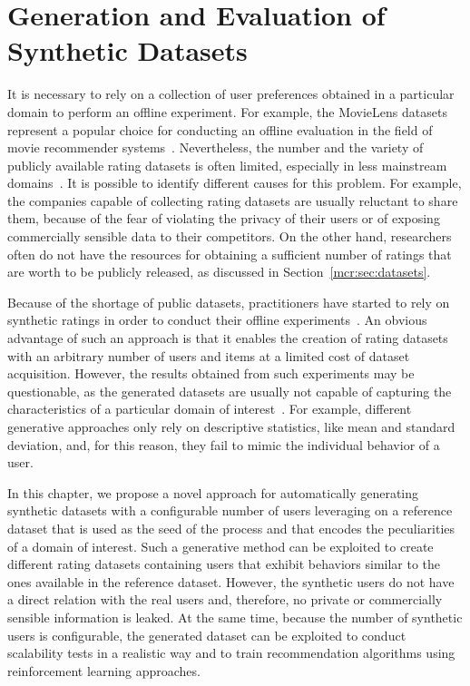 \chapter{Generation and Evaluation of Synthetic Datasets}
\label{chap:synthetic}

It is necessary to rely on a collection of user preferences obtained in a particular domain to perform an offline experiment. For example, the MovieLens datasets represent a popular choice for conducting an offline evaluation in the field of movie recommender systems~\cite{Harper2015}. Nevertheless, the number and the variety of publicly available rating datasets is often limited, especially in less mainstream domains~\cite{Tso2006}. It is possible to identify different causes for this problem. For example, the companies capable of collecting rating datasets are usually reluctant to share them, because of the fear of violating the privacy of their users or of exposing commercially sensible data to their competitors. On the other hand, researchers often do not have the resources for obtaining a sufficient number of ratings that are worth to be publicly released, as discussed in Section~\ref{mcr:sec:datasets}.

Because of the shortage of public datasets, practitioners have started to rely on synthetic ratings in order to conduct their offline experiments~\cite{Yu2012}. An obvious advantage of such an approach is that it enables the creation of rating datasets with an arbitrary number of users and items at a limited cost of dataset acquisition. However, the results obtained from such experiments may be questionable, as the generated datasets are usually not capable of capturing the characteristics of a particular domain of interest~\cite{Montaner2004}. For example, different generative approaches only rely on descriptive statistics, like mean and standard deviation, and, for this reason, they fail to mimic the individual behavior of a user.

In this chapter, we propose a novel approach for automatically generating synthetic datasets with a configurable number of users leveraging on a reference dataset that is used as the seed of the process and that encodes the peculiarities of a domain of interest. Such a generative method can be exploited to create different rating datasets containing users that exhibit behaviors similar to the ones available in the reference dataset. However, the synthetic users do not have a direct relation with the real users and, therefore, no private or commercially sensible information is leaked. At the same time, because the number of synthetic users is configurable, the generated dataset can be exploited to conduct scalability tests in a realistic way and to train recommendation algorithms using reinforcement learning approaches.

